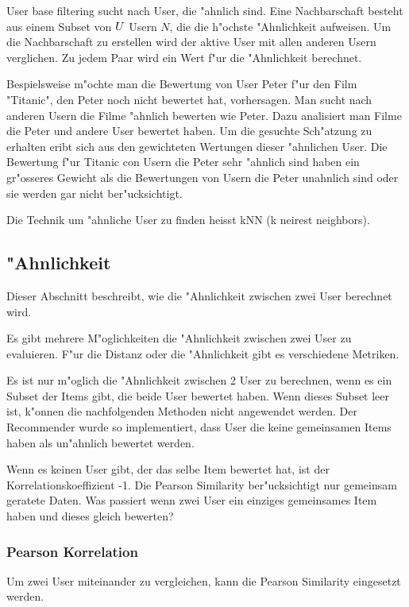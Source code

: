 \documentclass[a4paper, 11pt]{article}
\begin{document}
User base filtering sucht nach User, die "ahnlich sind. Eine Nachbarschaft besteht aus einem Subset von $ \mathnormal{U} $ Usern $N$, die die h"ochste "Ahnlichkeit aufweisen. Um die Nachbarschaft zu erstellen wird der aktive User mit allen anderen Usern verglichen. Zu jedem Paar wird ein Wert f"ur die "Ahnlichkeit berechnet.

Bespielsweise m"ochte man die Bewertung von User Peter f"ur den Film "Titanic", den Peter noch nicht bewertet hat, vorhersagen. Man sucht nach anderen Usern die Filme "ahnlich bewerten wie Peter. Dazu analisiert man Filme die Peter und andere User bewertet haben. Um die gesuchte Sch"atzung zu erhalten eribt sich aus den gewichteten Wertungen dieser "ahnlichen User. Die Bewertung f"ur Titanic con Usern die Peter sehr "ahnlich sind haben ein gr"osseres Gewicht als die Bewertungen von Usern die Peter unahnlich sind oder sie werden gar nicht ber"ucksichtigt.

Die Technik um "ahnliche User zu finden heisst kNN (k neirest neighbors). 

\subsection{"Ahnlichkeit}

Dieser Abschnitt beschreibt, wie die "Ahnlichkeit zwischen zwei User berechnet wird. 

Es gibt mehrere M"oglichkeiten die "Ahnlichkeit zwischen zwei User zu evaluieren. F"ur die Distanz oder die "Ahnlichkeit gibt es verschiedene Metriken. 

Es ist nur m"oglich die "Ahnlichkeit zwischen 2 User zu berechnen, wenn es ein Subset der Items gibt, die beide User bewertet haben. Wenn dieses Subset leer ist, k"onnen die nachfolgenden Methoden nicht angewendet werden. Der Recommender wurde so implementiert, dass User die keine gemeinsamen Items haben als un"ahnlich bewertet werden.

Wenn es keinen User gibt, der das selbe Item bewertet hat, ist der Korrelationskoeffizient -1.
Die Pearson Similarity ber"ucksichtigt nur gemeinsam geratete Daten.
Was passiert wenn zwei User ein einziges gemeinsames Item haben und dieses gleich bewerten?

\subsubsection{Pearson Korrelation}
\label{sec:pearsoncorrelation}

Um zwei User miteinander zu vergleichen, kann die Pearson Similarity eingesetzt werden.
\end{document}
